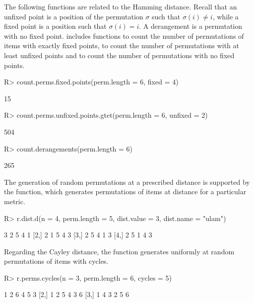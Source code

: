 \documentclass[article,nojss]{jss}
\begin{document}
The following functions are related to the Hamming distance. Recall that an unfixed point is  a position of the permutation $\sigma$ such that $\sigma(i) \neq i$, while a fixed point is a position such that  $\sigma(i) =i$. A derangement is a permutation with no fixed point.  includes functions to count the number of permutations of  items with exactly  fixed points, to count the number of permutations with at least  unfixed points and to count the number of permutations with no fixed points. 
\begin{Schunk}
\begin{Sinput}
R> count.perms.fixed.points(perm.length = 6, fixed = 4)
\end{Sinput}
\begin{Soutput}
[1] 15
\end{Soutput}
\begin{Sinput}
R> count.perms.unfixed.points.gtet(perm.length = 6, unfixed = 2)
\end{Sinput}
\begin{Soutput}
[1] 504
\end{Soutput}
\begin{Sinput}
R> count.derangements(perm.length = 6)
\end{Sinput}
\begin{Soutput}
[1] 265
\end{Soutput}
\end{Schunk}

The generation of random permutations at a prescribed distance is supported by the  function, which generates  permutations of  items at distance  for a particular metric.
\begin{Schunk}
\begin{Sinput}
R> r.dist.d(n = 4, perm.length = 5, dist.value = 3, dist.name = "ulam")
\end{Sinput}
\begin{Soutput}
     [,1] [,2] [,3] [,4] [,5]
[1,]    3    2    5    4    1
[2,]    2    1    5    4    3
[3,]    2    5    4    1    3
[4,]    2    5    1    4    3
\end{Soutput}
\end{Schunk}

Regarding the Cayley distance, the  function generates uniformly at random permutations of  items with  cycles. 
\begin{Schunk}
\begin{Sinput}
R> r.perms.cycles(n = 3, perm.length = 6, cycles = 5)
\end{Sinput}
\begin{Soutput}
     [,1] [,2] [,3] [,4] [,5] [,6]
[1,]    1    2    6    4    5    3
[2,]    1    2    5    4    3    6
[3,]    1    4    3    2    5    6
\end{Soutput}
\end{Schunk}
\end{document}
